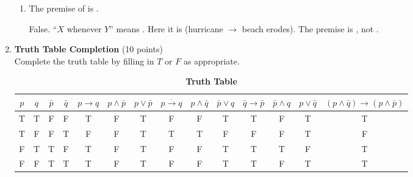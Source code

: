 \begin{enumerate}
\begin{enumerate}
    \item The premise of  is .\\
    \begin{subanswer}
      False. ``$X$ whenever $Y$'' means . Here it is  (hurricane $\rightarrow$ beach erodes). The premise is , not .
    \end{subanswer}
  \end{enumerate}








  \newpage




  \item \textbf{Truth Table Completion} (10 points)\\
  Complete the truth table by filling in $T$ or $F$ as appropriate.
  \begin{table}[h!]
  \centering
  \renewcommand{\arraystretch}{1.3}
  \setlength{\tabcolsep}{6pt}
  \caption*{\textbf{Truth Table}}
  \begin{tabular}{|c|c|c|c|c|c|c|c|c|c|c|c|c|c|}
  \hline
  \rowcolor[HTML]{E0E0E0}
  $p$ & $q$ & $\bar{p}$ & $\bar{q}$ & $p \rightarrow q$ & $p \wedge \bar{p}$ & $p \vee \bar{p}$ & $\overline{p \rightarrow q}$ & $p \wedge \bar{q}$ & $\bar{p} \vee q$ & $\bar{q} \rightarrow \bar{p}$ & $\bar{p} \wedge q$ & $p \vee \bar{q}$ & $(p \wedge \bar{q}) \rightarrow (p \wedge \bar{p})$ \\
  \hline
  T & T & F & F & T & F & T & F & F & T & T & F & T & T \\
  \hline
  T & F & F & T & F & F & T & T & T & F & F & F & T & F \\
  \hline
  F & T & T & F & T & F & T & F & F & T & T & T & F & T \\
  \hline
  F & F & T & T & T & F & T & F & F & T & T & F & T & T \\
  \hline
  \end{tabular}
  \end{table}



\end{enumerate}
